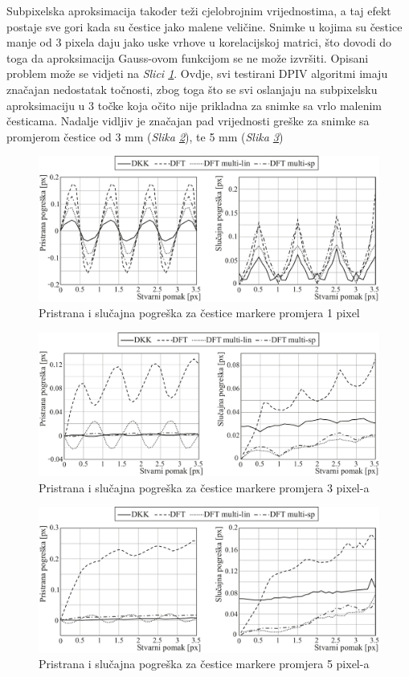 Subpixelska aproksimacija također teži cjelobrojnim vrijednostima, a taj efekt postaje sve gori kada su čestice jako malene veličine. Snimke u kojima su čestice manje od 3 pixela daju jako uske vrhove u korelacijskoj matrici, što dovodi do toga da aproksimacija Gauss-ovom funkcijom se ne može izvršiti. Opisani problem može se vidjeti na \textit{Slici \ref{sl:4.3}}. Ovdje, svi testirani DPIV algoritmi imaju značajan nedostatak točnosti, zbog toga što se svi oslanjaju na  subpixelsku aproksimaciju u $3$ točke koja očito nije prikladna za snimke sa vrlo malenim česticama. Nadalje vidljiv je značajan pad vrijednosti greške za snimke sa promjerom čestice od 3 mm (\textit{Slika \ref{sl:4.4}}), te 5 mm (\textit{Slika \ref{sl:4.5}})
\begin{figure}[h]  
	\centering
	\includegraphics[width=16.5cm]{./4_PIVNesigurnost/slika4_3.pdf} 
	\caption{Pristrana i slučajna pogreška za čestice markere promjera 1 pixel}
	\label{sl:4.3}
\end{figure}
\begin{figure}[h]  
	\centering
	\includegraphics[width=16.5cm]{./4_PIVNesigurnost/slika4_4.pdf} 
	\caption{Pristrana i slučajna pogreška za čestice markere promjera 3 pixel-a}
	\label{sl:4.4}
\end{figure}
\begin{figure}[h]  
	\centering
	\includegraphics[width=16.5cm]{./4_PIVNesigurnost/slika4_5.pdf} 
	\caption{Pristrana i slučajna pogreška za čestice markere promjera 5 pixel-a}
	\label{sl:4.5}
\end{figure}
\FloatBarrier
